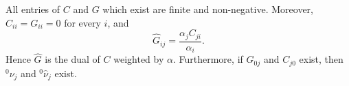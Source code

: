 All entries of $C$ and $G$ which exist are finite and non-negative. Moreover, $C_{ii} = G_{ii} = 0$ for every $i$, and
$$\hat{G}_{ij} = \frac{\alpha_j C_{ji}}{\alpha_i}.$$
Hence $\hat{G}$ is the dual of $C$ weighted by $\alpha$. Furthermore, if $G_{0j}$ and $C_{j0}$ exist, then ${}^0\nu_j$ and ${}^0\hat{\nu}_j$ exist.
